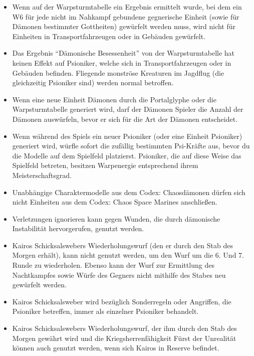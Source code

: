 \begin{itemize}

 \item Wenn auf der Warpsturmtabelle ein Ergebnis ermittelt wurde, bei dem ein
  W6 für jede nicht im Nahkampf gebundene gegnerische Einheit (sowie für Dämonen
  bestimmter Gottheiten) gewürfelt werden muss, wird nicht für Einheiten in
  Transportfahrzeugen oder in Gebäuden gewürfelt.

 \item Das Ergebnis ``Dämonische Besessenheit'' von der Warpsturmtabelle hat
  keinen Effekt auf Psioniker, welche sich in Transportfahrzeugen oder in
  Gebäuden befinden. Fliegende monströse Kreaturen im Jagdflug (die gleichzeitig
  Psioniker sind) werden normal betroffen.

 \item Wenn eine neue Einheit Dämonen durch die Portalglyphe oder die
  Warpsturmtabelle generiert wird, darf der Dämonen Spieler die Anzahl der
  Dämonen auswürfeln, bevor er sich für die Art der Dämonen entscheidet. 

 \item Wenn während des Spiels ein neuer Psioniker (oder eine Einheit Psioniker)
  generiert wird, würfle sofort die zufällig bestimmten Psi-Kräfte aus, bevor du
  die Modelle auf dem Spielfeld platzierst. Psioniker, die auf diese Weise das
  Spielfeld betreten, besitzen Warpenergie entsprechend ihrem
  Meisterschaftsgrad.

 \item Unabhängige Charaktermodelle aus dem Codex: Chaosdämonen dürfen sich
  nicht Einheiten aus dem Codex: Chaos Space Marines anschließen.

 \item Verletzungen ignorieren kann gegen Wunden, die durch dämonische
  Instabilität hervorgerufen, genutzt werden.

 \item Kairos Schicksalswebers Wiederholungswurf (den er durch den Stab des
  Morgen erhält), kann nicht genutzt werden, um den Wurf um die 6. Und 7. Runde
  zu wiederholen. Ebenso kann der Wurf zur Ermittlung des Nachtkampfes sowie
  Würfe des Gegners nicht mithilfe des Stabes neu gewürfelt werden.

 \item Kairos Schicksalsweber wird bezüglich Sonderregeln oder Angriffen, die
  Psioniker betreffen, immer als einzelner Psioniker behandelt.
 \item Kairos Schicksalswebers Wiederholungswurf, der ihm durch den Stab des
  Morgen gewährt wird und die Kriegsherrenfähigkeit Fürst der Unrealität können
  auch genutzt werden, wenn sich Kairos in Reserve befindet. 
 

\end{itemize}
